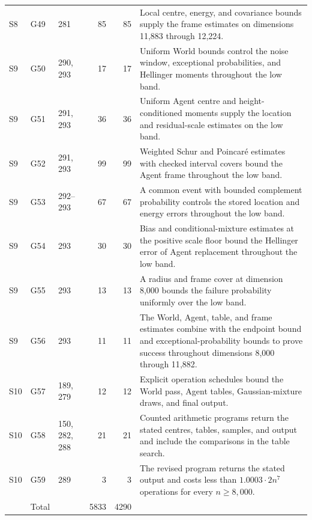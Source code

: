 \begin{longtable}{@{}l l p{} r r p{}@{}}
S8 & G49 & \raggedright 281 & 85 & 85 & \raggedright Local centre, energy, and covariance bounds supply the frame estimates on dimensions 11{,}883 through 12{,}224. \tabularnewline
S9 & G50 & \raggedright 290, 293 & 17 & 17 & \raggedright Uniform World bounds control the noise window, exceptional probabilities, and Hellinger moments throughout the low band. \tabularnewline
S9 & G51 & \raggedright 291, 293 & 36 & 36 & \raggedright Uniform Agent centre and height-conditioned moments supply the location and residual-scale estimates on the low band. \tabularnewline
S9 & G52 & \raggedright 291, 293 & 99 & 99 & \raggedright Weighted Schur and Poincaré estimates with checked interval covers bound the Agent frame throughout the low band. \tabularnewline
S9 & G53 & \raggedright 292--293 & 67 & 67 & \raggedright A common event with bounded complement probability controls the stored location and energy errors throughout the low band. \tabularnewline
S9 & G54 & \raggedright 293 & 30 & 30 & \raggedright Bias and conditional-mixture estimates at the positive scale floor bound the Hellinger error of Agent replacement throughout the low band. \tabularnewline
S9 & G55 & \raggedright 293 & 13 & 13 & \raggedright A radius and frame cover at dimension 8{,}000 bounds the failure probability uniformly over the low band. \tabularnewline
S9 & G56 & \raggedright 293 & 11 & 11 & \raggedright The World, Agent, table, and frame estimates combine with the endpoint bound and exceptional-probability bounds to prove success throughout dimensions 8{,}000 through 11{,}882. \tabularnewline
S10 & G57 & \raggedright 189, 279 & 12 & 12 & \raggedright Explicit operation schedules bound the World pass, Agent tables, Gaussian-mixture draws, and final output. \tabularnewline
S10 & G58 & \raggedright 150, 282, 288 & 21 & 21 & \raggedright Counted arithmetic programs return the stated centres, tables, samples, and output and include the comparisons in the table search. \tabularnewline
S10 & G59 & \raggedright 289 & 3 & 3 & \raggedright The revised program returns the stated output and costs less than $1.0003\cdot2n^7$ operations for every $n\ge8{,}000$. \tabularnewline
\midrule
& Total & & 5833 & 4290 & \\
\bottomrule
\end{longtable}
